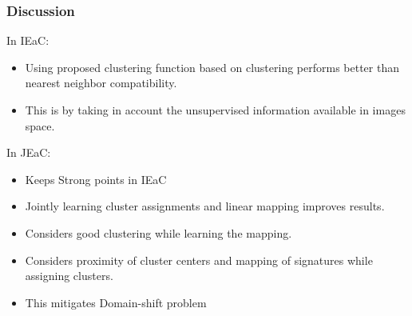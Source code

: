 \documentclass{beamer}
\begin{document}
\begin{frame}\frametitle{Discussion}
  In IEaC:
  \begin{itemize}
    \item Using proposed clustering function based on clustering performs better than nearest neighbor compatibility.
    \item This is by taking in account the  unsupervised information available in images space.
  \end{itemize}
  In JEaC:
  \begin{itemize}
    \item Keeps Strong points in IEaC
    \item Jointly learning cluster assignments and linear mapping improves results.
    \item Considers good clustering while learning the mapping.
    \item Considers proximity of cluster centers and mapping of signatures while assigning clusters.
    \item This mitigates Domain-shift problem
  \end{itemize}
\end{frame}
\end{document}
